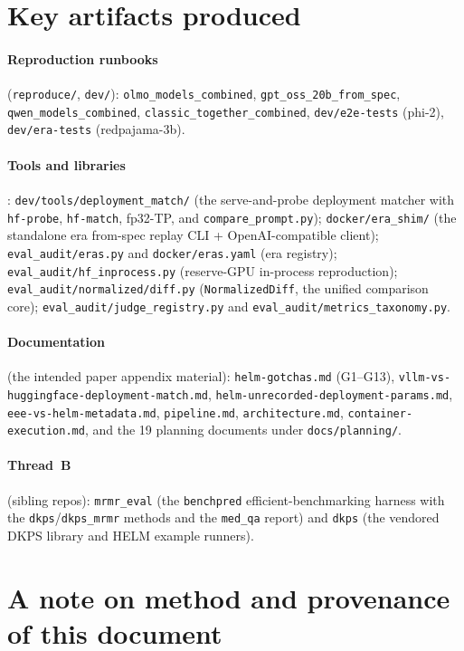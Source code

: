 \documentclass[11pt]{report}
\newcommand{\code}[1]{\texttt{#1}}
\newcommand{\file}[1]{\texttt{#1}}
\begin{document}
\section{Key artifacts produced}

\paragraph{Reproduction runbooks} (\file{reproduce/}, \file{dev/}):
\code{olmo\_models\_combined}, \code{gpt\_oss\_20b\_from\_spec},
\code{qwen\_models\_combined}, \code{classic\_together\_combined},
\code{dev/e2e-tests} (phi-2), \code{dev/era-tests} (redpajama-3b).

\paragraph{Tools and libraries}: \code{dev/tools/deployment\_match/} (the
serve-and-probe deployment matcher with \code{hf-probe}, \code{hf-match},
fp32-TP, and \code{compare\_prompt.py}); \code{docker/era\_shim/} (the standalone
era from-spec replay CLI + OpenAI-compatible client); \code{eval\_audit/eras.py}
and \code{docker/eras.yaml} (era registry); \code{eval\_audit/hf\_inprocess.py}
(reserve-GPU in-process reproduction); \code{eval\_audit/normalized/diff.py}
(\code{NormalizedDiff}, the unified comparison core);
\code{eval\_audit/judge\_registry.py} and \code{eval\_audit/metrics\_taxonomy.py}.

\paragraph{Documentation} (the intended paper appendix material):
\file{helm-gotchas.md} (G1--G13), \file{vllm-vs-huggingface-deployment-match.md},
\file{helm-unrecorded-deployment-params.md}, \file{eee-vs-helm-metadata.md},
\file{pipeline.md}, \file{architecture.md}, \file{container-execution.md}, and the
19 planning documents under \file{docs/planning/}.

\paragraph{Thread~B} (sibling repos): \file{mrmr\_eval} (the \code{benchpred}
efficient-benchmarking harness with the \code{dkps}/\code{dkps\_mrmr} methods and the
\code{med\_qa} report) and \file{dkps} (the vendored DKPS library and HELM example
runners).

\section{A note on method and provenance of this document}
\end{document}
